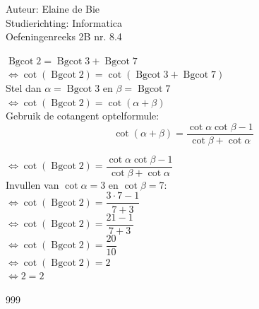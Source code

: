 \documentclass[a4paper]{article}
\newcommand{\Bgcot}{\operatorname{Bgcot}}
\begin{document}
  
\noindent \large Auteur: Elaine de Bie \\
\noindent \large Studierichting: Informatica\\
\noindent \large Oefeningenreeks 2B nr. 8.4\\


\medskip


\normalsize


$\Bgcot 2 = \Bgcot 3 + \Bgcot 7$\\

$\Leftrightarrow \cot(\Bgcot 2) = \cot(\Bgcot 3 + \Bgcot 7)$\\

Stel dan $ \alpha = \Bgcot 3 $ en $\beta = \Bgcot 7$\\

$\Leftrightarrow \cot(\Bgcot 2) = \cot(\alpha + \beta)$\\

Gebruik de cotangent optelformule: 
\[\cot(\alpha + \beta) = \dfrac{\cot\alpha \cot\beta -1}{\cot\beta + \cot\alpha}\]

$\Leftrightarrow \cot(\Bgcot 2) = \dfrac{\cot\alpha \cot\beta -1}{\cot\beta + \cot\alpha}$\\

Invullen van $\cot\alpha = 3$ en $\cot\beta = 7$:\\

$\Leftrightarrow \cot(\Bgcot 2) = \dfrac{3 \cdot 7 -1}{7 + 3}$\\

$\Leftrightarrow \cot(\Bgcot 2) = \dfrac{21 - 1}{7 + 3}$\\

$\Leftrightarrow \cot(\Bgcot 2) = \dfrac{20}{10}$\\

$\Leftrightarrow \cot(\Bgcot 2) = 2$\\

$\Leftrightarrow 2 = 2$\\




\begin{thebibliography}{999}
\end{thebibliography}
\end{document}

